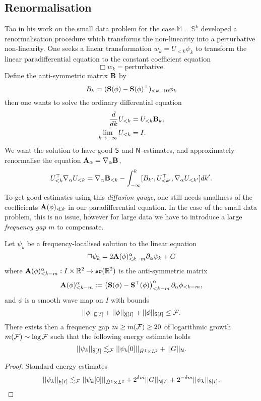 \subsection{Renormalisation}	
Tao in his work \cite{Tao2001} on the small data problem for the case $\mathbb M = \mathbb S^k$ developed a renormalisation procedure which transforms the non-linearity into a perturbative non-linearity. One seeks a linear transformation $w_k = U_{< k} \psi_k$ to transform the linear paradifferential equation to the constant coefficient equation
	\[
		\Box w_k = \text{perturbative} .
	\]
Define the anti-symmetric matrix ${\bf B}$ by 
	\[
		B_k = ({\bf S}(\phi) - {\bf S}(\phi)^\top)_{< k - 10} \phi_k
	\]
then one wants to solve the ordinary differential equation
	\begin{equation}
		\begin{split}
			\frac{d}{dk} U_{< k}
				&= U_{< k} {\bf B}_k, \\
			\lim_{k \to - \infty} U_{< k}
				&= I.
		\end{split}
		\label{eq:ODE}
	\end{equation}	
We want the solution to have good $\mathsf S$ and $\mathsf N$-estimates, and approximately renormalise the equation ${\bf A}_\alpha = \nabla_\alpha {\bf B}$,
	\begin{equation}
			U_{< k}^\top \nabla_\alpha U_{< k} = \nabla_\alpha {\bf B}_{< k} - \int_{-\infty}^k [B_{k'}, U^\top_{< k'} , \nabla_\alpha U_{< k'}] dk'.
	\end{equation}
To get good estimates using this \emph{diffusion gauge}, one still needs smallness of the coefficients ${\bf A}(\phi)_{\ll k}$ in our paradifferential equation. In the case of the small data problem, this is no issue, however for large data we have to introduce a large \emph{frequency gap} $m$ to compensate.
	
\begin{proposition}
	Let $\psi_k$ be a frequency-localised solution to the linear equation 
		\begin{equation}
			\Box \psi_k = 2 {\bf A} (\phi)_{< k - m}^\alpha \partial_\alpha \psi_k + G
			\label{eq:linwave}
		\end{equation} 
	where ${\bf A}(\phi)_{< k - m}^\alpha : I \times \mathbb R^2 \to \mathfrak{so} (\mathbb R^2)$ is the anti-symmetric matrix 
		\[
			{\bf A}(\phi)_{< k - m}^\alpha := \left({\bf S}(\phi) - {\bf S}^\top (\phi)\right)_{< k - m}^\alpha \partial_\alpha \phi_{< k - m},
		\]
	and $\phi$ is a smooth wave map on $I$ with bounds 
		\begin{equation}
			||\phi||_{\underline{\mathsf E} [I]} + ||\phi||_{\underline{\mathsf X} [I]} + ||\phi||_{\mathsf S [I]} \leq \mathcal F.
		\end{equation}
	There exists then a frequency gap $m \geq m(\mathcal F) \geq 20$ of logarithmic growth $m(\mathcal F) \sim \log \mathcal F$ such that the following energy estimate holds
		\begin{equation}
			||\psi_k||_{\mathsf S[I]}
				\lesssim_\mathcal F ||\psi_k [0]||_{\dot H^1 \times L^2} + ||G||_{\mathsf N}.\label{eq:renormest}
		\end{equation}	
\end{proposition}

\begin{proof}
	Standard energy estimates
		\begin{equation}
			||\psi_k||_{\underline{\mathsf E}[I]} \lesssim_\mathcal F ||\psi_k [0]||_{\dot H^1 \times L^2} + 2^{\delta m} || G||_{\mathsf N [I]} + 2^{-\delta m} || \psi_k||_{\mathsf S[I]}.
		\end{equation}
\end{proof}